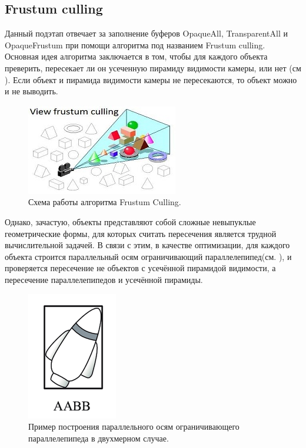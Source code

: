 	\subsection{Frustum culling} \label{ch3:pre_pass:frustum}
		Данный подэтап отвечает за заполнение буферов OpaqueAll, TransparentAll и OpaqueFrustum при помощи алгоритма под названием Frustum culling. Основная идея алгоритма заключается в том, чтобы для каждого объекта преверить, пересекает ли он усеченную пирамиду видимости камеры, или нет (см ). Если объект и пирамида видимости камеры не пересекаются, то объект можно и не выводить.
		\begin{figure}[ht!] 
			\center
			\includegraphics [scale=1] {my_folder/images//frustum_culling}	
			\caption{Схема работы алгоритма Frustum Culling.} 
			\label{fig:frustum_culling}
		\end{figure}
		
		Однако, зачастую, объекты представляют собой сложные невыпуклые геометрические формы, для которых считать пересечения является трудной вычислительной задачей. В связи с этим, в качестве оптимизации, для каждого объекта строится параллельный осям ограничивающий параллелепипед(см. ), и проверяется пересечение не объектов с усечённой пирамидой видимости, а пересечение параллелепипедов и усечённой пирамиды. 
		
		\begin{figure}[ht!] 
			\center
			\includegraphics [scale=0.8] {my_folder/images//aabb}	
			\caption{Пример построения параллельного осям ограничивающего параллелепипеда в двухмерном случае.} 
			\label{fig:aabb}
		\end{figure}
		
